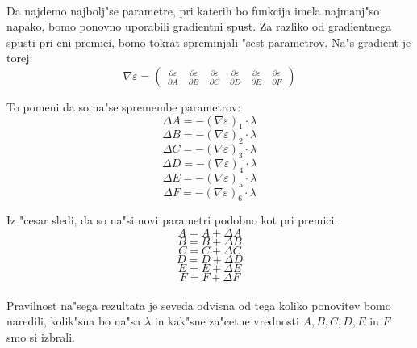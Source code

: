 \paragraph{}
Da najdemo najbolj"se parametre, pri katerih bo funkcija imela najmanj"so napako, bomo ponovno uporabili gradientni spust. Za razliko od gradientnega spusti pri eni premici, bomo tokrat spreminjali "sest parametrov. Na"s gradient je torej:
$$\nabla \varepsilon = \begin{pmatrix}
\frac{\partial \varepsilon}{\partial A} &
\frac{\partial \varepsilon}{\partial B} &
\frac{\partial \varepsilon}{\partial C} &
\frac{\partial \varepsilon}{\partial D} &
\frac{\partial \varepsilon}{\partial E} &
\frac{\partial \varepsilon}{\partial F}
\end{pmatrix}$$

To pomeni da so na"se spremembe parametrov:
$$\Delta A = -(\nabla \varepsilon)_1 \cdot \lambda$$
$$\Delta B = -(\nabla \varepsilon)_2 \cdot \lambda$$
$$\Delta C = -(\nabla \varepsilon)_3 \cdot \lambda$$
$$\Delta D = -(\nabla \varepsilon)_4 \cdot \lambda$$
$$\Delta E = -(\nabla \varepsilon)_5 \cdot \lambda$$
$$\Delta F = -(\nabla \varepsilon)_6 \cdot \lambda$$

Iz "cesar sledi, da so na"si novi parametri podobno kot pri premici:
$$A = A + \Delta A$$
$$B = B + \Delta B$$
$$C = C + \Delta C$$
$$D = D + \Delta D$$
$$E = E + \Delta E$$
$$F = F + \Delta F$$

\paragraph{}Pravilnost na"sega rezultata je seveda odvisna od tega koliko ponovitev bomo naredili, kolik"sna bo na"sa $\lambda$ in kak"sne za"cetne vrednosti $A, B, C, D, E$ in $F$ smo si izbrali.
